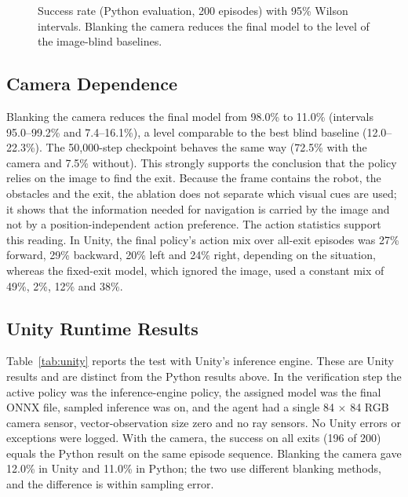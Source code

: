 \documentclass[conference]{IEEEtran}
\begin{document}
\begin{figure}[!t]
\centering
{}
\caption{Success rate (Python evaluation, 200 episodes) with 95\% Wilson intervals. Blanking the camera reduces the final model to the level of the image-blind baselines.}
\label{fig:bars}
\end{figure}


\subsection{Camera Dependence}
Blanking the camera reduces the final model from 98.0\% to 11.0\% (intervals 95.0--99.2\% and 7.4--16.1\%), a level comparable to the best blind baseline (12.0--22.3\%). The 50,000-step checkpoint behaves the same way (72.5\% with the camera and 7.5\% without). This strongly supports the conclusion that the policy relies on the image to find the exit. Because the frame contains the robot, the obstacles and the exit, the ablation does not separate which visual cues are used; it shows that the information needed for navigation is carried by the image and not by a position-independent action preference. The action statistics support this reading. In Unity, the final policy's action mix over all-exit episodes was 27\% forward, 29\% backward, 20\% left and 24\% right, depending on the situation, whereas the fixed-exit model, which ignored the image, used a constant mix of 49\%, 2\%, 12\% and 38\%.


\subsection{Unity Runtime Results}
Table~\ref{tab:unity} reports the test with Unity's inference engine. These are Unity results and are distinct from the Python results above. In the verification step the active policy was the inference-engine policy, the assigned model was the final ONNX file, sampled inference was on, and the agent had a single 84 $\times$ 84 RGB camera sensor, vector-observation size zero and no ray sensors. No Unity errors or exceptions were logged. With the camera, the success on all exits (196 of 200) equals the Python result on the same episode sequence. Blanking the camera gave 12.0\% in Unity and 11.0\% in Python; the two use different blanking methods, and the difference is within sampling error.
\end{document}
